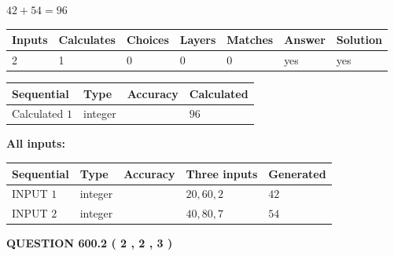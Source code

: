 \documentclass{ctexart}
\begin{document}
 

$ %
42 +  %
54=   %
96$
 
 
\noindent{}
 
 

 
   
   
   
   
\noindent\begin{tabular}{|l|l|l|l|l|l|l|}
 \hline
Inputs & Calculates & Choices & Layers & Matches & Answer & Solution \\ \hline
 2  & 
 1  & 
 0
  & 
 0  & 
 0  & 
  yes & 
  yes 
  \\ \hline
 \end{tabular}
   
   
   
   
\noindent{}
   
   
  
  
\noindent\begin{tabular}{|l|l|l|l|}
\hline
 Sequential & Type & Accuracy & Calculated \\ 
\hline
 
 
  Calculated $  1 $ & integer &  & 
  $ 96 $ 
 \\  \hline  
 \end{tabular}
   
   
   
   
\noindent\vspace{0.1in}\hspace{-0.08in} {\textbf{\Large{All inputs: }}}
   
   
  
  
\noindent\begin{tabular}{|l|l|l|l|l|}
\hline
 Sequential & Type & Accuracy & Three inputs & Generated \\ 
\hline
 
 
  INPUT $  1 $ & integer &  & $
 20
 , 
 60
 , 
 2
 $ & $ 42 $ 
 \\  \hline  
 
 
  INPUT $  2 $ & integer &  & $
 40
 , 
 80
 , 
 7
 $ & $ 54 $ 
 \\  \hline  
 \end{tabular}
   
   
  
\vspace{0.2in}
  
{\textbf{\Large{QUESTION
600.2 
 ( 2 , 2 , 3 )
}}}
  
\end{document}
